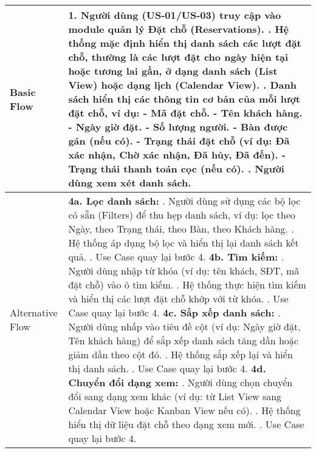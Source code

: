 \begin{longtable}{|m{4cm}|p{11cm}|}
\hline
Basic Flow & 1. Người dùng (US-01/US-03) truy cập vào module quản lý Đặt chỗ (Reservations). \newline 2. Hệ thống mặc định hiển thị danh sách các lượt đặt chỗ, thường là các lượt đặt cho ngày hiện tại hoặc tương lai gần, ở dạng danh sách (List View) hoặc dạng lịch (Calendar View). \newline 3. Danh sách hiển thị các thông tin cơ bản của mỗi lượt đặt chỗ, ví dụ: \newline    - Mã đặt chỗ. \newline    - Tên khách hàng. \newline    - Ngày giờ đặt. \newline    - Số lượng người. \newline    - Bàn được gán (nếu có). \newline    - Trạng thái đặt chỗ (ví dụ: Đã xác nhận, Chờ xác nhận, Đã hủy, Đã đến). \newline    - Trạng thái thanh toán cọc (nếu có). \newline 4. Người dùng xem xét danh sách. \\
\hline
Alternative Flow & \textbf{4a. Lọc danh sách:} \newline    1. Người dùng sử dụng các bộ lọc có sẵn (Filters) để thu hẹp danh sách, ví dụ: lọc theo Ngày, theo Trạng thái, theo Bàn, theo Khách hàng. \newline    2. Hệ thống áp dụng bộ lọc và hiển thị lại danh sách kết quả. \newline    3. Use Case quay lại bước 4. \newline \textbf{4b. Tìm kiếm:} \newline    1. Người dùng nhập từ khóa (ví dụ: tên khách, SĐT, mã đặt chỗ) vào ô tìm kiếm. \newline    2. Hệ thống thực hiện tìm kiếm và hiển thị các lượt đặt chỗ khớp với từ khóa. \newline    3. Use Case quay lại bước 4. \newline \textbf{4c. Sắp xếp danh sách:} \newline    1. Người dùng nhấp vào tiêu đề cột (ví dụ: Ngày giờ đặt, Tên khách hàng) để sắp xếp danh sách tăng dần hoặc giảm dần theo cột đó. \newline    2. Hệ thống sắp xếp lại và hiển thị danh sách. \newline    3. Use Case quay lại bước 4. \newline \textbf{4d. Chuyển đổi dạng xem:} \newline    1. Người dùng chọn chuyển đổi sang dạng xem khác (ví dụ: từ List View sang Calendar View hoặc Kanban View nếu có). \newline    2. Hệ thống hiển thị dữ liệu đặt chỗ theo dạng xem mới. \newline    3. Use Case quay lại bước 4. \\

\end{longtable}
